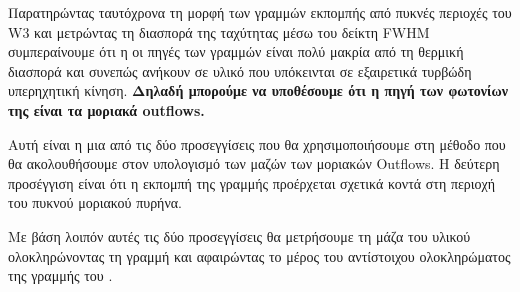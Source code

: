 \documentclass[a4paper,12pt]{memoir}
\begin{document}
Παρατηρώντας ταυτόχρονα τη μορφή των γραμμών εκπομπής από πυκνές περιοχές του W3 και μετρώντας τη διασπορά της ταχύτητας μέσω του δείκτη FWHM συμπεραίνουμε ότι η οι πηγές των γραμμών  είναι πολύ μακρία από τη θερμική διασπορά και συνεπώς ανήκουν σε υλικό που υπόκεινται σε εξαιρετικά τυρβώδη υπερηχητική κίνηση. \textbf{Δηλαδή μπορούμε να υποθέσουμε ότι η πηγή των φωτονίων της  είναι τα μοριακά outflows.}
 
Αυτή είναι η μια από τις δύο προσεγγίσεις που θα χρησιμοποιήσουμε στη μέθοδο που θα ακολουθήσουμε στον υπολογισμό των μαζών των μοριακών Outflows. Η δεύτερη προσέγγιση είναι ότι η εκπομπή της γραμμής  προέρχεται σχετικά κοντά στη περιοχή του πυκνού μοριακού πυρήνα. 

Με βάση λοιπόν αυτές τις δύο προσεγγίσεις θα μετρήσουμε τη μάζα του υλικού ολοκληρώνοντας τη γραμμή  και αφαιρώντας το μέρος του αντίστοιχου ολοκληρώματος της γραμμής του .


\end{document}
